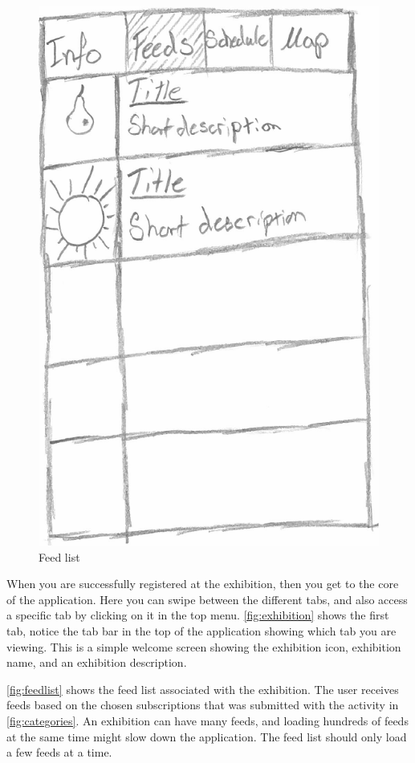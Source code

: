 \begin{figure}[H]
\begin{minipage}[b]{0.5\columnwidth}
\includegraphics[width=0.7\columnwidth]{img/prototype/4.png}
\caption{Feed list\label{fig:feedlist}}
\end{minipage}
\end{figure}

When you are successfully registered at the exhibition, then you get to the core of the application. Here you can swipe between the different tabs, and also access a specific tab by clicking on it in the top menu. \autoref{fig:exhibition} shows the first tab, notice the tab bar in the top of the application showing which tab you are viewing. This is a simple welcome screen showing the exhibition icon, exhibition name, and an exhibition description.

\autoref{fig:feedlist} shows the feed list associated with the exhibition. The user receives feeds based on the chosen subscriptions that was submitted with the activity in \autoref{fig:categories}. An exhibition can have many feeds, and loading hundreds of feeds at the same time might slow down the application. The feed list should only load a few feeds at a time.

